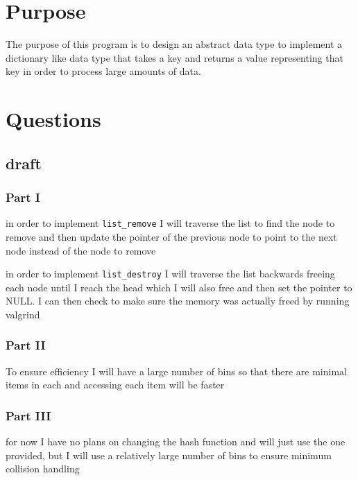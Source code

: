 \documentclass{article}
\title{\ASSIGNMENT}
\author{\NAME}
\date{\CLASS}
\begin{document}
\pagestyle{fancy}
\fancyfoot{}
\fancyhead{}
\fancyfoot[L]{\ASSIGNMENT\ -- \CLASS\ -- \NAME}
\fancyfoot[R]{\thepage}

\maketitle



\section*{Purpose}

The purpose of this program is to design an abstract data type to implement a dictionary like data type that takes a key and returns a value representing that key in order to process large amounts of data.

\section*{Questions}
\subsection*{draft}    
\subsubsection*{Part I}
in order to implement \lstinline{list_remove} I will traverse the list to find the node to remove and then update the pointer of the previous node to point to the next node instead of the node to remove

in order to implement \lstinline{list_destroy} I will traverse the list backwards freeing each node until I reach the head which I will also free and then set the pointer to NULL. I can then check to make sure the memory was actually freed by running valgrind

\subsubsection*{Part II}
To ensure efficiency I will have a large number of bins so that there are minimal items in each and accessing each item will be faster

\subsubsection*{Part III} 
for now I have no plans on changing the hash function and will just use the one provided, but I will use a relatively large number of bins to ensure minimum collision handling
\end{document}
